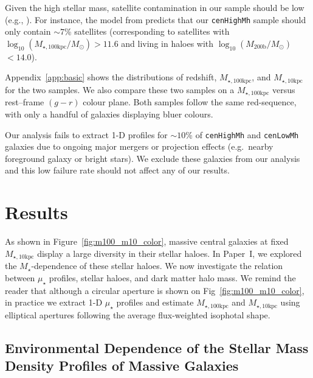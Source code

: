 \documentclass[a4paper,fleqn,usenatbib]{mnras}
\def\rbcg{\texttt{cenHighMh}}
\def\nbcg{\texttt{cenLowMh}}
\def\mstar{{$M_{\star}$}}
\def\logmh{{$\log_{10} (M_{\mathrm{200b}}/M_{\odot})$}}
\def\minn{{$M_{\star,10\mathrm{kpc}}$}}
\def\mtot{{$M_{\star,100\mathrm{kpc}}$}}
\def\logmtot{{$\log_{10} (M_{\star,100\mathrm{kpc}}/M_{\odot})$}}
\def\mden{{$\mu_{\star}$}}
\begin{document}
    Given the high stellar mass, satellite contamination in our sample should be 
    low (e.g., \citealt{Reid2014, Hoshino2015, Saito2016, vanUitert2016}). 
    For instance, the model from \citet{Saito2016} predicts that our \rbcg{} sample 
    should only contain $\sim 7$\% satellites (corresponding to satellites with 
    \logmtot{}$>11.6$ and living in haloes with \logmh$<14.0$).
    
    Appendix~\ref{app:basic} shows the distributions of redshift, \mtot{}, and 
    \minn{} for the two samples. 
    We also compare these two samples on a \mtot{} versus rest--frame $(g-r)$ colour 
    plane. 
    Both samples follow the same red-sequence, with only a handful of galaxies 
    displaying bluer colours.
    
    Our analysis fails to extract 1-D profiles for $\sim10$\% of 
    \rbcg{} and \nbcg{} galaxies due to ongoing major mergers or projection effects 
    (e.g.\ nearby foreground galaxy or bright stars). 
    We exclude these galaxies from our analysis and this low failure rate should not 
    affect any of our results.
    

\section{Results}
    \label{sec:result}
    
    As shown in Figure~\ref{fig:m100_m10_color}, massive central galaxies at fixed  
    \minn{} display a large diversity in their stellar haloes. 
    In Paper~I, we explored the \mstar{}-dependence of these stellar haloes. 
    We now investigate the relation between \mden{} profiles, stellar haloes, and 
    dark matter halo mass. 
    We remind the reader that although a circular aperture is shown on 
    Fig~\ref{fig:m100_m10_color}, in practice we extract 1-D \mden{} profiles and 
    estimate \mtot{} and \minn{} using elliptical apertures following the average 
    flux-weighted isophotal shape. 

\subsection{Environmental Dependence of the Stellar Mass Density Profiles of Massive 
            Galaxies}
    \label{ssec:sbp_mtot} 
       
\end{document}
